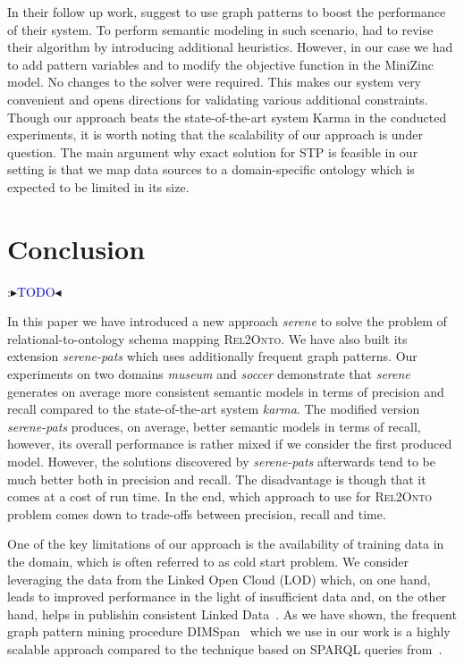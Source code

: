 \documentclass[letterpaper]{article} %
\newcommand{\authornote}[3]{
  {\fbox{\sc 
  #1}:$\blacktriangleright$\textcolor{#2}{\small{#3}}$\blacktriangleleft$}%
}
\newcommand{\ddg}[1]{\authornote{DDG}{blue}{#1}}
\newcommand{\npr}[1]{\authornote{NPR}{orange}{#1}}
\newcommand{\relonto}{\textsc{Rel2Onto}}
\begin{document}
In their follow up work, \cite{Taheriyan:Leveraging} suggest to use graph patterns to boost the performance of their system.
To perform semantic modeling in such scenario, \cite{Taheriyan:Leveraging} had to revise their algorithm by introducing additional heuristics.
However, in our case we had to add pattern variables and to modify the objective function in the MiniZinc model.
No changes to the solver were required.
This makes our system very convenient and opens directions for validating various additional constraints.
Though our approach beats the state-of-the-art system Karma in the conducted experiments, it is worth noting that the scalability of our approach is under question.
The main argument why exact solution for STP is feasible in our setting is that we map data sources to a domain-specific ontology which is expected to be limited in its size.


\section{Conclusion}
\ddg{TODO} 
In this paper we have introduced a new approach \emph{serene} to solve the problem of relational-to-ontology schema mapping \relonto{}.
We have also built its extension \emph{serene-pats} which uses additionally frequent graph patterns.
Our experiments on two domains \emph{museum} and \emph{soccer} demonstrate that \emph{serene} generates on average more consistent semantic models in terms of precision and recall compared to the state-of-the-art system \emph{karma}.
The modified version \emph{serene-pats} produces, on average, better semantic models in terms of recall, however, its overall performance is rather mixed if we consider the first produced model.
However, the solutions discovered by \emph{serene-pats} afterwards tend to be much better both in precision and recall.
The disadvantage is though that it comes at a cost of run time.
In the end, which approach to use for \relonto{} problem comes down to trade-offs between precision, recall and time.

One of the key limitations of our approach is the availability of training data in the domain, which is often referred to as cold start problem.
We consider leveraging the data from the Linked Open Cloud (LOD) which, on one hand, leads to improved performance in the light of insufficient data and, on the other hand, helps in publishin consistent Linked Data~\cite{Taheriyan:Leveraging}. 
As we have shown, the frequent graph pattern mining procedure DIMSpan~\cite{petermann2017dimspan} which we use in our work is a highly scalable approach compared to the technique based on SPARQL queries from~\cite{Taheriyan:Leveraging}.
\end{document}
